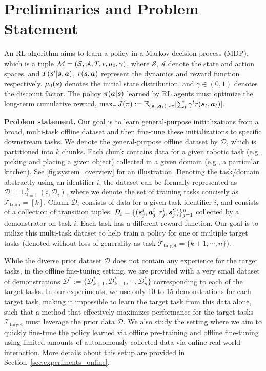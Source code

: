 \vspace{0.1cm}
\section{Preliminaries and Problem Statement}
\vspace{0.1cm}
An RL algorithm aims to learn a policy in a Markov decision process (MDP), which is a tuple $\mathcal{M} = (\mathcal{S}, \mathcal{A}, T, r, \mu_0, \gamma)$, where $\mathcal{S}, \mathcal{A}$ denote the state and action spaces, and
$T(\boldsymbol{s}' | \boldsymbol{s}, \boldsymbol{a})$, $r(\boldsymbol{s},\boldsymbol{a})$ represent the dynamics and reward function respectively. 
$\mu_0(\boldsymbol{s})$ denotes the initial state distribution, and $\gamma \in (0,1)$ denotes the discount factor. The policy $\pi(\boldsymbol{a}|\boldsymbol{s})$ learned by RL agents must optimize the long-term cumulative reward, $\max_\pi J(\pi) := \mathbb{E}_{(\boldsymbol{s}_t, \boldsymbol{a}_t) \sim \pi}[\sum_{t} \gamma^t r(\boldsymbol{s}_t, \boldsymbol{a}_t)].$ 

\textbf{Problem statement.} Our goal is to learn general-purpose initializations from a broad, multi-task offline dataset and then fine-tune these initializations to specific downstream tasks. We denote the general-purpose offline dataset by $\mathcal{D}$, which is partitioned into $k$ chunks. Each chunk contains data for a given robotic task (e.g., picking and placing a given object) collected in a given domain (e.g., a particular kitchen). See \autoref{fig:system_overview} for an illustration. 
Denoting the task/domain abstractly using an identifier $i$, the dataset can be formally represented as $\mathcal{D} = \cup_{i=1}^k \left(i, \mathcal{D}_i \right)$, where we denote the set of training tasks concisely as $\mathcal{T}_{\text{train}} = [k]$. Chunk $\mathcal{D}_i$ consists of data for a given task identifier $i$, and consists of a collection of transition tuples, $\mathcal{D}_i = \{(\boldsymbol{s}^i_j, \boldsymbol{a}^i_j, r^i_j, \boldsymbol{s}'^i_j)\}_{j=1}^n$ collected by a demonstrator on task $i$. Each task has a different reward function. Our goal is to utilize this multi-task dataset to help train a policy for one or multiple target tasks (denoted without loss of generality as task $\mathcal{T}_{\text{target}} = \{k+1, \cdots, n\}$). 

While the diverse prior dataset $\mathcal{D}$ does not contain any experience for the target tasks, in the offline fine-tuning setting, we are provided with a very small dataset of demonstrations $\mathcal{D}^* := \{\mathcal{D}_{k+1}^*, \mathcal{D}^*_{k+1}, \cdots, \mathcal{D}^*_n\}$ corresponding to each of the target tasks. In our experiments, we use only 10 to 15 demonstrations for each target task, making it impossible to learn the target task from this data alone, such that a method that effectively maximizes performance for the target tasks $\mathcal{T}_\text{target}$ must leverage the prior data $\mathcal{D}$. We also study the setting where we aim to quickly fine-tune the policy learned via offline pre-training and offline fine-tuning using limited amounts of autonomously collected data via online real-world interaction. More details about this setup are provided in Section~\ref{sec:experiments_online}.
 
